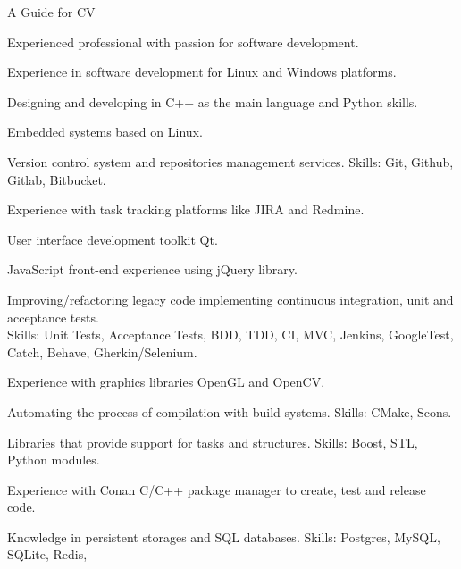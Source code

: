 

\begin{cventries}

  \cventry
    {A Guide for CV} %
    {
      \begin{cvitems} %
        \item {Experienced professional with passion for software development.}
        \item {Experience in software development for Linux and Windows platforms.}
        \item {Designing and developing in C++ as the main language and Python skills.}
        \item {Embedded systems based on Linux.}
        \item {Version control system and repositories management services. Skills: Git, Github, Gitlab, Bitbucket.}
        \item {Experience with task tracking platforms like JIRA and Redmine.}
        \item {User interface development toolkit Qt.}
        \item {JavaScript front-end experience using jQuery library.}
        \item {Improving/refactoring legacy code implementing continuous integration, unit and acceptance tests.\\
        Skills: Unit Tests, Acceptance Tests, BDD, TDD, CI, MVC, Jenkins, GoogleTest, Catch, Behave,
        Gherkin/Selenium.}
        \item {Experience with graphics libraries OpenGL and OpenCV.}
        \item {Automating the process of compilation with build systems. Skills: CMake, Scons.}
        \item {Libraries that provide support for tasks and structures. Skills: Boost, STL, Python modules.}
        \item {Experience with Conan C/C++ package manager to create, test and release code.}
        \item {Knowledge in persistent storages and SQL databases. Skills: Postgres, MySQL, SQLite, Redis,
}
\end{cvitems}}
\end{cventries}
